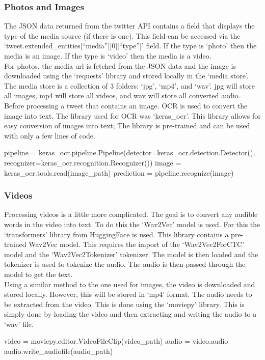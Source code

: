 \subsubsection{Photos and Images}
The JSON data returned from the twitter API contains a field that displays the type of the media source (if there is one). This field can be accessed
via the `tweet.extended\_entities[``media''][0][``type'']' field. If the type is `photo' then the media is an image. If the type is `video' then the 
media is a video.\\
For photos, the media url is fetched from the JSON data and the image is downloaded using the `requests' library and stored locally in the `media store'.
The media store is a collection of 3 folders: `jpg', `mp4', and `wav'. jpg will store all images, mp4 will store all videos, and wav will store all converted audio.\\
Before processing a tweet that contains an image. OCR is used to convert the image into text. The library used for OCR was `keras\_ocr'. This library allows for
easy conversion of images into text; The library is pre-trained and can be used with only a few lines of code.
\begin{algorithm}
    \begin{algorithmic}
        \STATE pipeline = keras\_ocr.pipeline.Pipeline(detector=keras\_ocr.detection.Detector(), recognizer=keras\_ocr.recognition.Recognizer())
        \STATE image = keras\_ocr.tools.read(image\_path)
        \STATE prediction = pipeline.recognize(image)
    \end{algorithmic}
\end{algorithm}

\subsubsection{Videos}
Processing videos is a little more complicated. The goal is to convert any audible words in the video into text. To do this the `Wav2Vec' model is used. For this
the `transformers' library from HuggingFace is used. This library contains a pre-trained Wav2Vec model. This requires the import of the `Wav2Vec2ForCTC' model and
the `Wav2Vec2Tokenizer' tokenizer. The model is then loaded and the tokenizer is used to tokenize the audio. The audio is then passed through the model to get
the text.\\
Using a similar method to the one used for images, the video is downloaded and stored locally. However, this will be stored in `mp4' format. The audio needs to
be extracted from the video. This is done using the `moviepy' library. This is simply done by loading the video and then extracting and writing the audio to
a `wav' file.
\begin{algorithm}
    \begin{algorithmic}
        \STATE video = moviepy.editor.VideoFileClip(video\_path)
        \STATE audio = video.audio
        \STATE audio.write\_audiofile(audio\_path)
    \end{algorithmic}
\end{algorithm}

